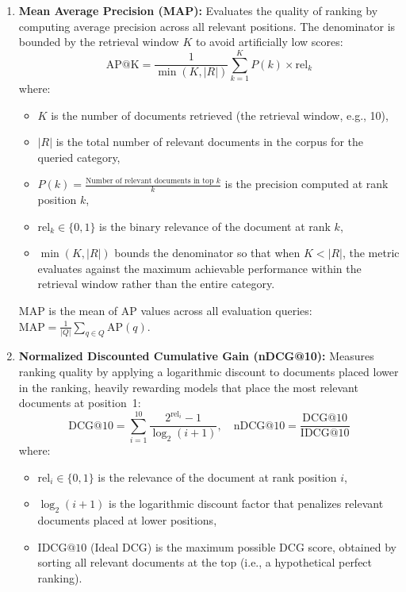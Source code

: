 \documentclass[11pt,a4paper]{article}
\begin{document}
\begin{enumerate}[label=\textbf{\arabic*.}]
    \item \textbf{Mean Average Precision (MAP):} Evaluates the quality of ranking by computing average precision across all relevant positions. The denominator is bounded by the retrieval window $K$ to avoid artificially low scores:
    \begin{equation}
    \text{AP@K} = \frac{1}{\min(K, |R|)} \sum_{k=1}^{K} P(k) \times \text{rel}_k
    \end{equation}
    where:
    \begin{itemize}[leftmargin=1.5em, topsep=2pt]
        \item $K$ is the number of documents retrieved (the retrieval window, e.g., 10),
        \item $|R|$ is the total number of relevant documents in the corpus for the queried category,
        \item $P(k) = \frac{\text{Number of relevant documents in top } k}{k}$ is the precision computed at rank position $k$,
        \item $\text{rel}_k \in \{0, 1\}$ is the binary relevance of the document at rank $k$,
        \item $\min(K, |R|)$ bounds the denominator so that when $K < |R|$, the metric evaluates against the maximum achievable performance within the retrieval window rather than the entire category.
    \end{itemize}
    MAP is the mean of AP values across all evaluation queries: $\text{MAP} = \frac{1}{|Q|} \sum_{q \in Q} \text{AP}(q)$.

    \item \textbf{Normalized Discounted Cumulative Gain (nDCG@10):} Measures ranking quality by applying a logarithmic discount to documents placed lower in the ranking, heavily rewarding models that place the most relevant documents at position~1:
    \begin{equation}
    \text{DCG@10} = \sum_{i=1}^{10} \frac{2^{\text{rel}_i} - 1}{\log_2(i + 1)}, \quad \text{nDCG@10} = \frac{\text{DCG@10}}{\text{IDCG@10}}
    \end{equation}
    where:
    \begin{itemize}[leftmargin=1.5em, topsep=2pt]
        \item $\text{rel}_i \in \{0, 1\}$ is the relevance of the document at rank position $i$,
        \item $\log_2(i + 1)$ is the logarithmic discount factor that penalizes relevant documents placed at lower positions,
        \item $\text{IDCG@10}$ (Ideal DCG) is the maximum possible DCG score, obtained by sorting all relevant documents at the top (i.e., a hypothetical perfect ranking).
    \end{itemize}
\end{enumerate}
\end{document}
